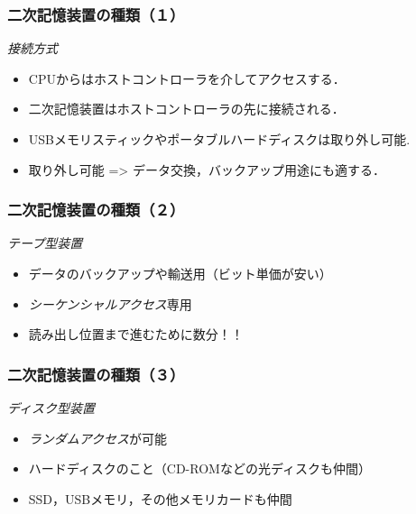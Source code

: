 \documentclass[unicode,handout]{beamer}                   %
\begin{document}
\begin{frame}
  \frametitle{二次記憶装置の種類（１）}
  \emph{接続方式}
  \begin{itemize}
  \item CPUからはホストコントローラを介してアクセスする．
  \item 二次記憶装置はホストコントローラの先に接続される．
  \item USBメモリスティックやポータブルハードディスクは取り外し可能.
  \item 取り外し可能 => データ交換，バックアップ用途にも適する．
  \end{itemize}
\end{frame}

\begin{frame}
  \frametitle{二次記憶装置の種類（２）}
  \emph{テープ型装置}
  \begin{itemize}
  \item データのバックアップや輸送用（ビット単価が安い）
  \item \emph{シーケンシャルアクセス}専用
  \item 読み出し位置まで進むために数分！！
  \end{itemize}
\end{frame}

\begin{frame}
  \frametitle{二次記憶装置の種類（３）}
  \emph{ディスク型装置}
  \begin{itemize}
  \item \emph{ランダムアクセス}が可能
  \item ハードディスクのこと（CD-ROMなどの光ディスクも仲間）
  \item SSD，USBメモリ，その他メモリカードも仲間
  \end{itemize}
\end{frame}
\end{document}
